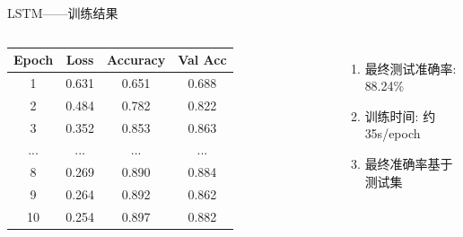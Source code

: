 \documentclass{beamer}
\begin{document}
\begin{frame}{LSTM——训练结果}
    \begin{columns}
        \begin{table}
            \begin{tabular}{cccc}
                \hline
                Epoch & Loss & Accuracy & Val Acc \\
                \hline
                1 & 0.631 & 0.651 & 0.688 \\
                2 & 0.484 & 0.782 & 0.822 \\
                3 & 0.352 & 0.853 & 0.863 \\
                ... & ... & ... & ... \\
                8 & 0.269 & 0.890 & 0.884 \\
                9 & 0.264 & 0.892 & 0.862 \\
                10 & 0.254 & 0.897 & 0.882 \\
                \hline
            \end{tabular}
        \end{table}
        \vspace{0.3cm}
        \begin{enumerate}
            \item 最终测试准确率: 88.24\%
            \item 训练时间: 约35s/epoch
            \item 最终准确率基于测试集
        \end{enumerate}


\end{columns}
\end{frame}
\end{document}
